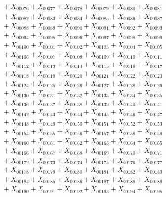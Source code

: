 \documentclass[a4paper,10pt]{article}
\begin{document}
{\begin{align}
&\quad  + X_{00076} + X_{00077} + X_{00078} + X_{00079} + X_{00080} + X_{00081} \\[0.5ex]
&\quad  + X_{00082} + X_{00083} + X_{00084} + X_{00085} + X_{00086} + X_{00087} \\[0.5ex]
&\quad  + X_{00088} + X_{00089} + X_{00090} + X_{00091} + X_{00092} + X_{00093} \\[0.5ex]
&\quad  + X_{00094} + X_{00095} + X_{00096} + X_{00097} + X_{00098} + X_{00099} \\[0.5ex]
&\quad  + X_{00100} + X_{00101} + X_{00102} + X_{00103} + X_{00104} + X_{00105} \\[0.5ex]
&\quad  + X_{00106} + X_{00107} + X_{00108} + X_{00109} + X_{00110} + X_{00111} \\[0.5ex]
&\quad  + X_{00112} + X_{00113} + X_{00114} + X_{00115} + X_{00116} + X_{00117} \\[0.5ex]
&\quad  + X_{00118} + X_{00119} + X_{00120} + X_{00121} + X_{00122} + X_{00123} \\[0.5ex]
&\quad  + X_{00124} + X_{00125} + X_{00126} + X_{00127} + X_{00128} + X_{00129} \\[0.5ex]
&\quad  + X_{00130} + X_{00131} + X_{00132} + X_{00133} + X_{00134} + X_{00135} \\[0.5ex]
&\quad  + X_{00136} + X_{00137} + X_{00138} + X_{00139} + X_{00140} + X_{00141} \\[0.5ex]
&\quad  + X_{00142} + X_{00143} + X_{00144} + X_{00145} + X_{00146} + X_{00147} \\[0.5ex]
&\quad  + X_{00148} + X_{00149} + X_{00150} + X_{00151} + X_{00152} + X_{00153} \\[0.5ex]
&\quad  + X_{00154} + X_{00155} + X_{00156} + X_{00157} + X_{00158} + X_{00159} \\[0.5ex]
&\quad  + X_{00160} + X_{00161} + X_{00162} + X_{00163} + X_{00164} + X_{00165} \\[0.5ex]
&\quad  + X_{00166} + X_{00167} + X_{00168} + X_{00169} + X_{00170} + X_{00171} \\[0.5ex]
&\quad  + X_{00172} + X_{00173} + X_{00174} + X_{00175} + X_{00176} + X_{00177} \\[0.5ex]
&\quad  + X_{00178} + X_{00179} + X_{00180} + X_{00181} + X_{00182} + X_{00183} \\[0.5ex]
&\quad  + X_{00184} + X_{00185} + X_{00186} + X_{00187} + X_{00188} + X_{00189} \\[0.5ex]
&\quad  + X_{00190} + X_{00191} + X_{00192} + X_{00193} + X_{00194} + X_{00195} \\[0.5ex]

\end{align}}
\end{document}
